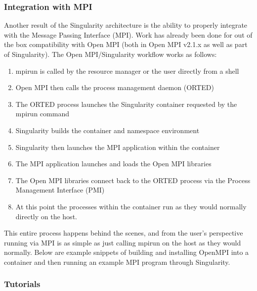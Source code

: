 \documentclass[letterpaper,10pt,english]{sphinxmanual}
\begin{document}
\subsubsection{Integration with MPI}
\label{\detokenize{installation_environments:integration-with-mpi}}
Another result of the Singularity architecture is the ability to
properly integrate with the Message Passing Interface (MPI). Work has
already been done for out of the box compatibility with Open MPI (both
in Open MPI v2.1.x as well as part of Singularity). The Open
MPI/Singularity workflow works as follows:
\begin{enumerate}
\item {} 
mpirun is called by the resource manager or the user directly from a
shell

\item {} 
Open MPI then calls the process management daemon (ORTED)

\item {} 
The ORTED process launches the Singularity container requested by the
mpirun command

\item {} 
Singularity builds the container and namespace environment

\item {} 
Singularity then launches the MPI application within the container

\item {} 
The MPI application launches and loads the Open MPI libraries

\item {} 
The Open MPI libraries connect back to the ORTED process via the
Process Management Interface (PMI)

\item {} 
At this point the processes within the container run as they would
normally directly on the host.

\end{enumerate}

This entire process happens behind the scenes, and from the user’s
perspective running via MPI is as simple as just calling mpirun on the
host as they would normally.
Below are example snippets of building and installing OpenMPI into a
container and then running an example MPI program through Singularity.


\subsubsection{Tutorials}
\label{\detokenize{installation_environments:tutorials}}
\end{document}
